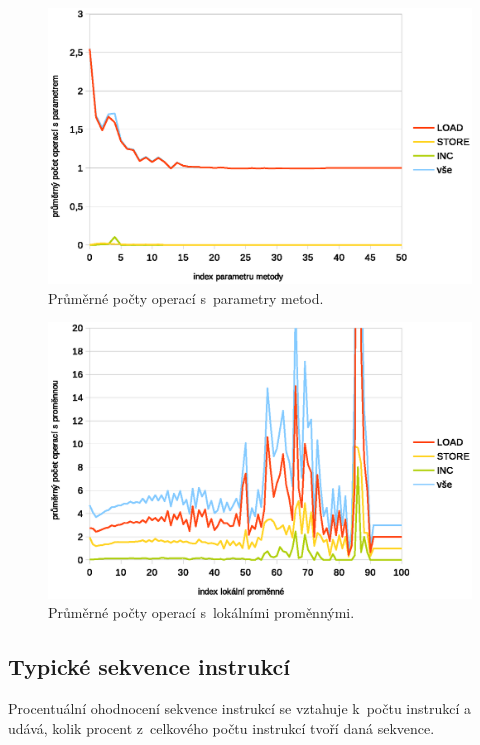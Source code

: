 \begin{figure}[h!]
\centering
\includegraphics[scale=0.9]{fig/params}
\caption{Průměrné počty operací s~parametry metod.}\label{fig:params}
\end{figure}

\begin{figure}[h!]
\centering
\includegraphics[scale=0.9]{fig/locals} 
\caption{Průměrné počty operací s~lokálními proměnnými.}\label{fig:vars}
\end{figure}

\subsection{Typické sekvence instrukcí}

Procentuální ohodnocení sekvence instrukcí se vztahuje k~počtu instrukcí a udává, kolik procent z~celkového počtu instrukcí tvoří daná sekvence. 

